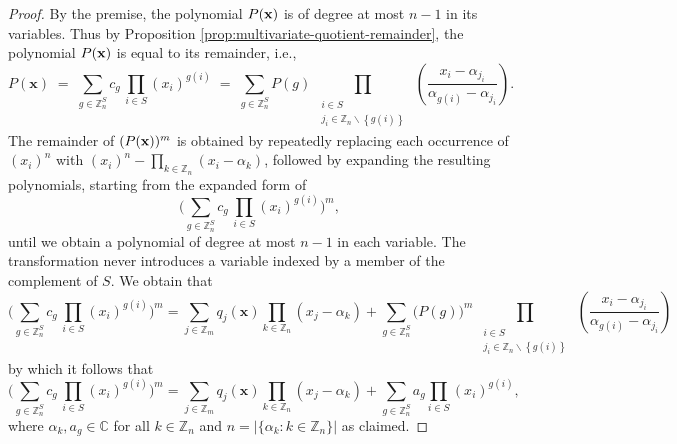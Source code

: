 \begin{proof}
  By the premise, the polynomial $P({\bf x})$ is of degree at most $n-1$
in its variables. Thus by Proposition \ref{prop:multivariate-quotient-remainder}, the polynomial $P({\bf x})$
is equal to its remainder, i.e.,
\begin{equation}
P(\mathbf{x})\;=\;\sum_{g\in\mathbb{Z}_{n}^{S}}c_{g}\,\prod_{i\in S}(x_{i})^{g(i)}\;=\;\sum_{g\in\mathbb{Z}_{n}^{S}}P(g)\prod_{\begin{array}{c}
\substack{i\in S\\
j_{i}\in\mathbb{Z}_{n}\backslash\left\{ g(i)\right\} 
}
\end{array}}\left(\frac{x_{i}-\alpha_{j_{i}}}{\alpha_{g(i)}-\alpha_{j_{i}}}\right).
\end{equation}
 The remainder of $(P({\bf x}))^m$ is obtained by repeatedly replacing each occurrence
of $(x_{i})^{n}$ with $(x_{i})^{n}-\underset{k\in\mathbb{Z}_{n}}{\prod}(x_{i}-\alpha_{k})$, followed by expanding the resulting polynomials, starting from the
expanded form of 
\begin{equation}
\bigg(\sum_{g\in\mathbb{Z}_{n}^{S}}c_{g}\,\prod_{i\in S}(x_{i})^{g(i)}\bigg)^{m},
\end{equation}
until we obtain a polynomial of degree at most $n-1$ in each variable.
The transformation never introduces a variable indexed by a member
of the complement of $S$. We obtain that 
\[
\bigg(\sum_{g\in\mathbb{Z}_{n}^{S}}c_{g}\,\prod_{i\in S}(x_{i})^{g(i)}\bigg)^{m}=\sum_{j\in\mathbb{Z}_{m}}q_{j}(\mathbf{x})\prod_{k\in\mathbb{Z}_{n}}(x_{j}-\alpha_{k})+\sum_{g\in\mathbb{Z}_{n}^{S}}\big(P(g)\big)^{m}\prod_{\begin{array}{c}
\substack{i\in S\\
j_{i}\in\mathbb{Z}_{n}\backslash\left\{ g(i)\right\} 
}
\end{array}}\left(\frac{x_{i}-\alpha_{j_{i}}}{\alpha_{g(i)}-\alpha_{j_{i}}}\right)
\]
by which it follows that 
\begin{equation}
\bigg(\sum_{g\in\mathbb{Z}_{n}^{S}}c_{g}\,\prod_{i\in S}(x_{i})^{g(i)}\bigg)^{m}=\sum_{j\in\mathbb{Z}_{m}}q_{j}(\mathbf{x})\prod_{k\in\mathbb{Z}_{n}}(x_{j}-\alpha_{k})+\sum_{g\in\mathbb{Z}_{n}^{S}}a_{g}\prod_{i\in S}(x_{i})^{g(i)},
\end{equation}
where $\alpha_k, a_g\in \mathbb{C}$ for all $k\in \mathbb{Z}_n$ and $n=\left|\big\{\alpha_{k}:k\in\mathbb{Z}_{n}\big\}\right|$
as claimed.
\end{proof}
